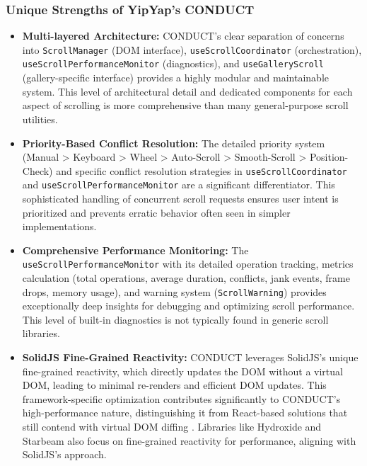 \documentclass[10pt]{article}
\begin{document}
\subsubsection{Unique Strengths of YipYap's CONDUCT}
\begin{itemize}
    \item \textbf{Multi-layered Architecture:} CONDUCT's clear separation of concerns into \texttt{ScrollManager} (DOM interface), \texttt{useScrollCoordinator} (orchestration), \texttt{useScrollPerformanceMonitor} (diagnostics), and \texttt{useGalleryScroll} (gallery-specific interface) provides a highly modular and maintainable system. This level of architectural detail and dedicated components for each aspect of scrolling is more comprehensive than many general-purpose scroll utilities.
    \item \textbf{Priority-Based Conflict Resolution:} The detailed priority system (Manual > Keyboard > Wheel > Auto-Scroll > Smooth-Scroll > Position-Check) and specific conflict resolution strategies in \texttt{useScrollCoordinator} and \texttt{useScrollPerformanceMonitor} are a significant differentiator. This sophisticated handling of concurrent scroll requests ensures user intent is prioritized and prevents erratic behavior often seen in simpler implementations.
    \item \textbf{Comprehensive Performance Monitoring:} The \texttt{useScrollPerformanceMonitor} with its detailed operation tracking, metrics calculation (total operations, average duration, conflicts, jank events, frame drops, memory usage), and warning system (\texttt{ScrollWarning}) provides exceptionally deep insights for debugging and optimizing scroll performance. This level of built-in diagnostics is not typically found in generic scroll libraries.
    \item \textbf{SolidJS Fine-Grained Reactivity:} CONDUCT leverages SolidJS's unique fine-grained reactivity, which directly updates the DOM without a virtual DOM, leading to minimal re-renders and efficient DOM updates. This framework-specific optimization contributes significantly to CONDUCT's high-performance nature, distinguishing it from React-based solutions that still contend with virtual DOM diffing \cite{monday}. Libraries like Hydroxide \cite{hydroxide} and Starbeam \cite{starbeam} also focus on fine-grained reactivity for performance, aligning with SolidJS's approach.
\end{itemize}
\end{document}
